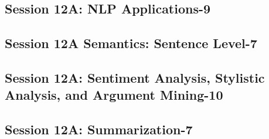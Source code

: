 \subsection{\large Session 12A: NLP Applications-9}
\label{parallel-session-12A-trackF}
\TrackFLoc\hfill\sessionchair{}{}
\clearpage
\subsection{\large Session 12A Semantics: Sentence Level-7}
\label{parallel-session-12A-trackG}
\TrackGLoc\hfill\sessionchair{}{}
\clearpage
\subsection{\large Session 12A: Sentiment Analysis, Stylistic Analysis, and Argument Mining-10}
\label{parallel-session-12A-trackH}
\TrackHLoc\hfill\sessionchair{}{}
\clearpage
\subsection{\large Session 12A: Summarization-7}
\label{parallel-session-12A-trackI}
\TrackILoc\hfill\sessionchair{}{}
\clearpage


